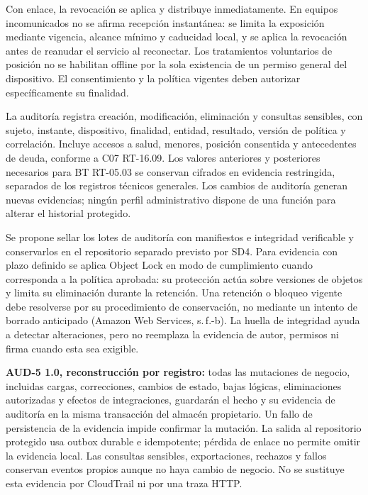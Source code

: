 Con enlace, la revocación se aplica y distribuye inmediatamente. En equipos incomunicados no se afirma recepción instantánea: se limita la exposición mediante vigencia, alcance mínimo y caducidad local, y se aplica la revocación antes de reanudar el servicio al reconectar. Los tratamientos voluntarios de posición no se habilitan offline por la sola existencia de un permiso general del dispositivo. El consentimiento y la política vigentes deben autorizar específicamente su finalidad.

La auditoría registra creación, modificación, eliminación y consultas sensibles, con sujeto, instante, dispositivo, finalidad, entidad, resultado, versión de política y correlación. Incluye accesos a salud, menores, posición consentida y antecedentes de deuda, conforme a C07 RT-16.09. Los valores anteriores y posteriores necesarios para BT RT-05.03 se conservan cifrados en evidencia restringida, separados de los registros técnicos generales. Los cambios de auditoría generan nuevas evidencias; ningún perfil administrativo dispone de una función para alterar el historial protegido.

Se propone sellar los lotes de auditoría con manifiestos e integridad verificable y conservarlos en el repositorio separado previsto por SD4. Para evidencia con plazo definido se aplica Object Lock en modo de cumplimiento cuando corresponda a la política aprobada: su protección actúa sobre versiones de objetos y limita su eliminación durante la retención. Una retención o bloqueo vigente debe resolverse por su procedimiento de conservación, no mediante un intento de borrado anticipado (Amazon Web Services, s.\,f.-b). La huella de integridad ayuda a detectar alteraciones, pero no reemplaza la evidencia de autor, permisos ni firma cuando esta sea exigible.


\label{subsec:sd5_auditoria_reconstructiva}
\textbf{AUD-5 1.0, reconstrucción por registro:} todas las mutaciones de negocio, incluidas cargas, correcciones, cambios de estado, bajas lógicas, eliminaciones autorizadas y efectos de integraciones, guardarán el hecho y su evidencia de auditoría en la misma transacción del almacén propietario. Un fallo de persistencia de la evidencia impide confirmar la mutación. La salida al repositorio protegido usa outbox durable e idempotente; pérdida de enlace no permite omitir la evidencia local. Las consultas sensibles, exportaciones, rechazos y fallos conservan eventos propios aunque no haya cambio de negocio. No se sustituye esta evidencia por CloudTrail ni por una traza HTTP.

